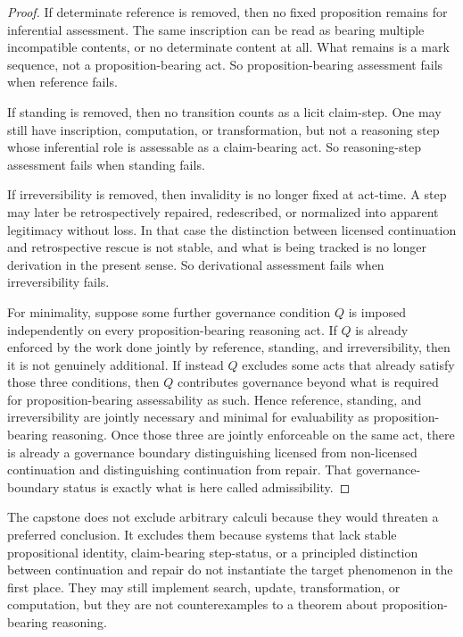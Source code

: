 \begin{proof}
If determinate reference is removed, then no fixed proposition remains for inferential assessment. The same inscription can be read as bearing multiple incompatible contents, or no determinate content at all. What remains is a mark sequence, not a proposition-bearing act. So proposition-bearing assessment fails when reference fails.

If standing is removed, then no transition counts as a licit claim-step. One may still have inscription, computation, or transformation, but not a reasoning step whose inferential role is assessable as a claim-bearing act. So reasoning-step assessment fails when standing fails.

If irreversibility is removed, then invalidity is no longer fixed at act-time. A step may later be retrospectively repaired, redescribed, or normalized into apparent legitimacy without loss. In that case the distinction between licensed continuation and retrospective rescue is not stable, and what is being tracked is no longer derivation in the present sense. So derivational assessment fails when irreversibility fails.

For minimality, suppose some further governance condition $Q$ is imposed independently on every proposition-bearing reasoning act. If $Q$ is already enforced by the work done jointly by reference, standing, and irreversibility, then it is not genuinely additional. If instead $Q$ excludes some acts that already satisfy those three conditions, then $Q$ contributes governance beyond what is required for proposition-bearing assessability as such. Hence reference, standing, and irreversibility are jointly necessary and minimal for evaluability as proposition-bearing reasoning. Once those three are jointly enforceable on the same act, there is already a governance boundary distinguishing licensed from non-licensed continuation and distinguishing continuation from repair. That governance-boundary status is exactly what is here called admissibility.\cite{MaleyFoundationalClosure}
\end{proof}

\begin{remark}
The capstone does not exclude arbitrary calculi because they would threaten a preferred conclusion. It excludes them because systems that lack stable propositional identity, claim-bearing step-status, or a principled distinction between continuation and repair do not instantiate the target phenomenon in the first place. They may still implement search, update, transformation, or computation, but they are not counterexamples to a theorem about proposition-bearing reasoning.\cite{MaleyFoundationalClosure}
\end{remark}

